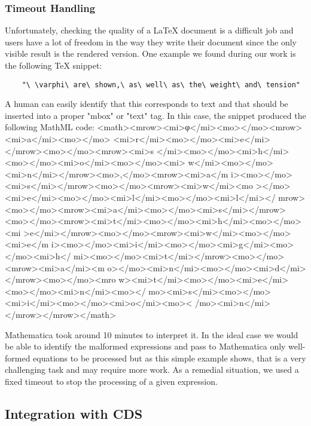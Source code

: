\subsubsection{Timeout Handling}
Unfortunately, checking the quality of a LaTeX document is a difficult job and users have a lot of freedom in the way they write their document since the only visible result is the rendered version. 
One example we found during our work is the following TeX snippet:
\begin{verbatim}
	"\ \varphi\ are\ shown,\ as\ well\ as\ the\ weight\ and\ tension"
\end{verbatim}
A human can easily identify that this corresponds to text and that should be inserted into a proper "mbox" or "text" tag. In this case, the snippet produced the following MathML code:
\small{\codefont <math><mrow><mi>φ</mi><mo></mo><mrow><mi>a</mi><mo></mo>
<mi>r</mi><mo></mo><mi>e</mi></mrow><mo></mo><mrow><mi>s
</mi><mo></mo><mi>h</mi><mo></mo><mi>o</mi><mo></mo><mi>
w</mi><mo></mo><mi>n</mi></mrow><mo>,</mo><mrow><mi>a</m
i><mo></mo><mi>s</mi></mrow><mo></mo><mrow><mi>w</mi><mo
></mo><mi>e</mi><mo></mo><mi>l</mi><mo></mo><mi>l</mi></
mrow><mo></mo><mrow><mi>a</mi><mo></mo><mi>s</mi></mrow>
<mo></mo><mrow><mi>t</mi><mo></mo><mi>h</mi><mo></mo><mi
>e</mi></mrow><mo></mo><mrow><mi>w</mi><mo></mo><mi>e</m
i><mo></mo><mi>i</mi><mo></mo><mi>g</mi><mo></mo><mi>h</
mi><mo></mo><mi>t</mi></mrow><mo></mo><mrow><mi>a</mi><m
o></mo><mi>n</mi><mo></mo><mi>d</mi></mrow><mo></mo><mro
w><mi>t</mi><mo></mo><mi>e</mi><mo></mo><mi>n</mi><mo></
mo><mi>s</mi><mo></mo><mi>i</mi><mo></mo><mi>o</mi><mo><
/mo><mi>n</mi></mrow></mrow></math>
}

Mathematica took around 10 minutes to interpret it.
In the ideal case we would be able to identify the malformed expressions and pass to Mathematica only well-formed equations to be processed but as this simple example shows, that is a very challenging task and may require more work.
As a remedial situation, we used a fixed timeout to stop the processing of a given expression.

\subsection{Integration with CDS}
